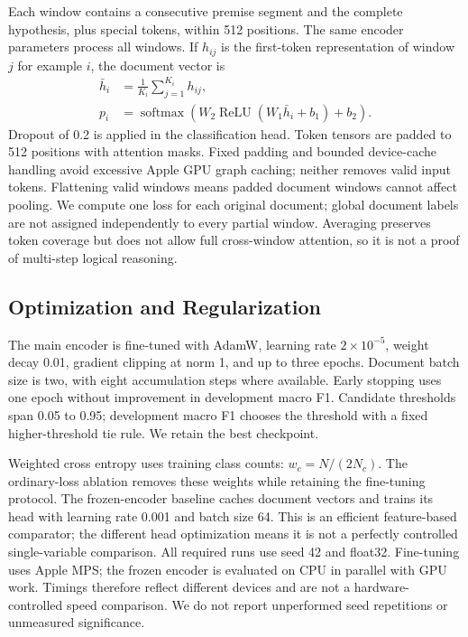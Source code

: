 \documentclass[conference]{IEEEtran}
\begin{document}
Each window contains a consecutive premise segment and the complete hypothesis, plus special tokens, within 512 positions. The same encoder parameters process all windows. If $h_{ij}$ is the first-token representation of window $j$ for example $i$, the document vector is
\begin{align}
\bar h_i&=\frac{1}{K_i}\sum_{j=1}^{K_i}h_{ij},\\
p_i&=\operatorname{softmax}(W_2\operatorname{ReLU}(W_1\bar h_i+b_1)+b_2).
\end{align}
Dropout of 0.2 is applied in the classification head. Token tensors are padded to 512 positions with attention masks. Fixed padding and bounded device-cache handling avoid excessive Apple GPU graph caching; neither removes valid input tokens. Flattening valid windows means padded document windows cannot affect pooling. We compute one loss for each original document; global document labels are not assigned independently to every partial window. Averaging preserves token coverage but does not allow full cross-window attention, so it is not a proof of multi-step logical reasoning.

\subsection{Optimization and Regularization}
The main encoder is fine-tuned with AdamW, learning rate $2\times10^{-5}$, weight decay 0.01, gradient clipping at norm 1, and up to three epochs. Document batch size is two, with eight accumulation steps where available. Early stopping uses one epoch without improvement in development macro F1. Candidate thresholds span 0.05 to 0.95; development macro F1 chooses the threshold with a fixed higher-threshold tie rule. We retain the best checkpoint.

Weighted cross entropy uses training class counts: $w_c=N/(2N_c)$. The ordinary-loss ablation removes these weights while retaining the fine-tuning protocol. The frozen-encoder baseline caches document vectors and trains its head with learning rate 0.001 and batch size 64. This is an efficient feature-based comparator; the different head optimization means it is not a perfectly controlled single-variable comparison. All required runs use seed 42 and float32. Fine-tuning uses Apple MPS; the frozen encoder is evaluated on CPU in parallel with GPU work. Timings therefore reflect different devices and are not a hardware-controlled speed comparison. We do not report unperformed seed repetitions or unmeasured significance.
\end{document}
